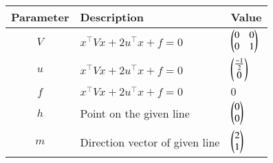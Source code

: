 \begin{tabular}{|c|p{5cm}|p{1cm}|}
    \hline
	Parameter  & Description & Value\\
    \hline
        $V$ &   $x^\top Vx + 2u^\top x + f = 0$ & $\begin{pmatrix}0&0\\0&1\end{pmatrix}$ \\
    \hline
        $u$ & $x^\top Vx + 2u^\top x + f = 0$ & $\begin{pmatrix}\frac{-1}{2}\\0\end{pmatrix}$ \\
    \hline
	$f$ & $x^\top Vx + 2u^\top x + f = 0$ & $0$ \\
    \hline 
	$h$ & Point on the given line &  $\begin{pmatrix}0\\0\end{pmatrix}$ \\
    \hline
        $m$ & Direction vector of given line &  $\begin{pmatrix}2 \\ 1\end{pmatrix}$ \\
    \hline	
\end{tabular}
